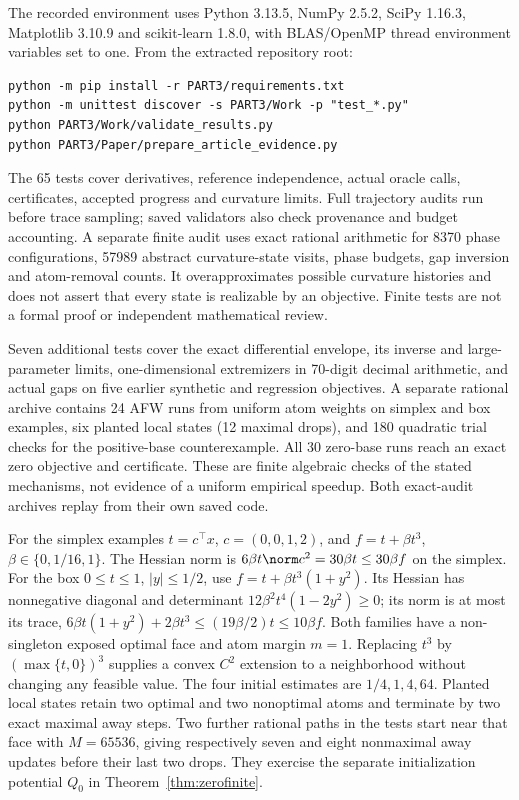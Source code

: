 The recorded environment uses Python 3.13.5, NumPy 2.5.2, SciPy 1.16.3,
Matplotlib 3.10.9 and scikit-learn 1.8.0, with BLAS/OpenMP thread
environment variables set to one. From the extracted repository root:
\begin{verbatim}
python -m pip install -r PART3/requirements.txt
python -m unittest discover -s PART3/Work -p "test_*.py"
python PART3/Work/validate_results.py
python PART3/Paper/prepare_article_evidence.py
\end{verbatim}
The 65 tests cover derivatives, reference independence, actual oracle
calls, certificates, accepted progress and curvature limits. Full
trajectory audits run before trace sampling; saved validators also
check provenance and budget accounting.
A separate finite audit uses exact rational arithmetic for 8370
phase configurations, 57989 abstract curvature-state visits, phase
budgets, gap inversion and atom-removal counts. It overapproximates
possible curvature histories and does not assert that every state
is realizable by an objective. Finite tests are not a formal proof
or independent mathematical review.

Seven additional tests cover the exact differential envelope, its
inverse and large-parameter limits, one-dimensional extremizers in
70-digit decimal arithmetic, and actual gaps on five earlier synthetic
and regression objectives. A separate rational archive contains 24
AFW runs from uniform atom weights on simplex and box examples, six planted
local states (12 maximal drops), and 180 quadratic trial checks for
the positive-base counterexample. All 30 zero-base runs reach an
exact zero objective and certificate. These are finite algebraic
checks of the stated mechanisms, not evidence of a uniform empirical
speedup. Both exact-audit archives replay from their own saved code.

For the simplex examples $t=c^\top x$, $c=(0,0,1,2)$, and
$f=t+\beta t^3$, $\beta\in\{0,1/16,1\}$. The Hessian norm is
$6\beta t\norm c^2=30\beta t\le30\beta f$ on the simplex.
For the box $0\le t\le1$, $|y|\le1/2$, use
$f=t+\beta t^3(1+y^2)$. Its Hessian has nonnegative diagonal and
determinant $12\beta^2t^4(1-2y^2)\ge0$; its norm is at most its
trace, $6\beta t(1+y^2)+2\beta t^3\le(19\beta/2)t\le10\beta f$.
Both families have a non-singleton exposed optimal face and atom
margin $m=1$. Replacing $t^3$ by $(\max\{t,0\})^3$ supplies a
convex $C^2$ extension to a neighborhood without changing any feasible
value. The four initial estimates are $1/4,1,4,64$. Planted local
states retain two optimal and two nonoptimal atoms and terminate by
two exact maximal away steps.
Two further rational paths in the tests start near that face with
$M=65536$, giving respectively seven and eight nonmaximal away
updates before their last two drops. They exercise the separate
initialization potential $Q_0$ in Theorem~\ref{thm:zerofinite}.

